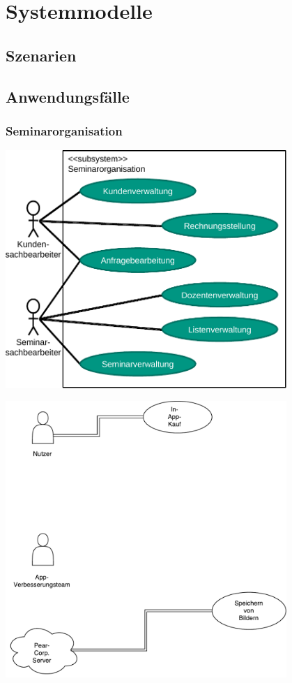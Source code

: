 \documentclass[parskip=full]{scrartcl}
\begin{document}
\section{Systemmodelle}

\subsection{Szenarien}

\subsection{Anwendungsfälle}
\subsubsection{Seminarorganisation}
\begin{center}
\includegraphics[width=0.8\textwidth]{szenario_seminarorganisation.pdf}
\end{center}



\includegraphics[width=0.8\textwidth]{use case diagram.pdf}
\end{document}
